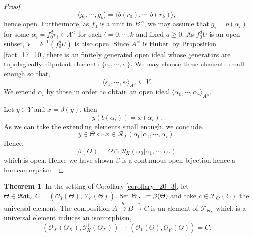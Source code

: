 \documentclass[10pt]{article}
\numberwithin{equation}{section}
\theoremstyle{definition}
\newtheorem{theorem}{Theorem} [subsection]
\newcommand{\defeq}{\vcentcolon=}
\newcommand{\Ouv}{\mathscr{O}}
\newcommand{\cR}[0]{\mathcal{R}}
\newcommand{\cF}[0]{\mathcal{F}}
\newcommand{\Rat}[0]{\mathfrak{Rat}}
\begin{document}
\begin{proof}
\begin{equation*}
\langle g_0,\cdots,g_k\rangle = \langle b(r_0),\cdots,b(r_k)\rangle,
\end{equation*}
hence open. Furthermore, as $f_0$ is a unit in $B^\triangleleft$, we may assume that $g_i = b(\alpha_i)$ for some $\alpha_i = f_0^dr_i\in A^\triangleleft$ for each $i=0,\cdots,k$ and fixed $d\geq0$. As $f^d_0U$ is an open subset, $V=b^{-1}(f_0^dU)$ is also open. Since $A^\triangleleft$ is Huber, by Proposition \ref{fact_17_10}, there is an finitely generated open ideal whose generators are topologically nilpotent elements $\{s_1,\cdots,s_l\}$.
We may choose these elements small enough so that,
\begin{equation*}
    \langle s_1,\cdots,s_l\rangle_{A^\triangleleft}\subseteq V.
\end{equation*}
We extend $\alpha_i$ by those in order to obtain an open ideal $\langle \alpha_0,\cdots,\alpha_r\rangle_{A^\triangleleft}$.
\par Let $y\in Y$ and $x=\beta(y)$, then
\begin{equation*}
    y(b(\alpha_i)) = x(\alpha_i).
\end{equation*}
As we can take the extending elements small enough, we conclude,
\begin{equation*}
    y\in\Theta\iff x\in\cR_X(\alpha_0|\alpha_1,\cdots,\alpha_r).
\end{equation*}
Hence,
\begin{equation*}
    \beta(\Theta) = \Omega\cap \cR_X(\alpha_0|\alpha_1,\cdots,\alpha_r)
\end{equation*}
which is open. Hence we have shown $\beta$ is a continuous open bijection hence a homeomorphism.
\end{proof}
\begin{theorem}
    In the setting of Corollary \ref{corollary_20_3}, let $\Theta\in\Rat_Y,C = (\Ouv_Y(\Theta),\Ouv_Y^+(\Theta))$. Set $\Theta_X\defeq \beta(\Theta)$ and take $c\in\mathcal{F}_\Theta(C)$ the universal element. The composition $A\stackrel{b}{\to}B\stackrel{c}{\to}C$ is an element of $\cF_{\Theta_X}$ which is a universal element induces an isomorphism,
        \begin{equation*}
            (\Ouv_X(\Theta_X),\Ouv_{X}^+(\Theta_X))\to(\Ouv_Y(\Theta),\Ouv_Y^+(\Theta))=C.
        \end{equation*}
        \label{theorem_21_2}
\end{theorem}
\end{document}
